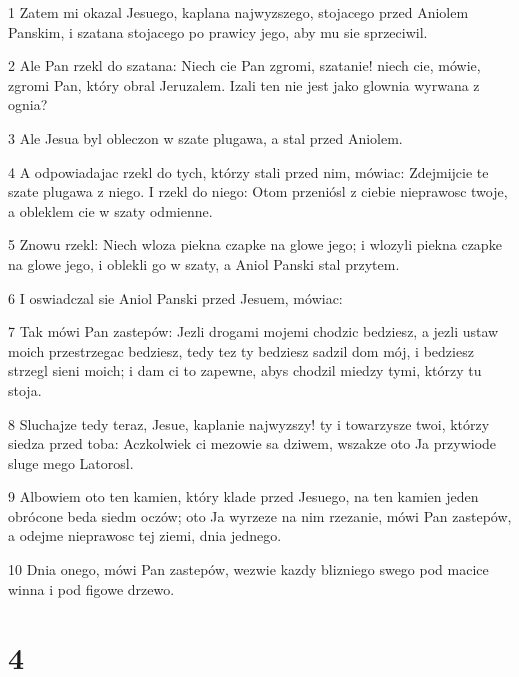 \par 1 Zatem mi okazal Jesuego, kaplana najwyzszego, stojacego przed Aniolem Panskim, i szatana stojacego po prawicy jego, aby mu sie sprzeciwil.
\par 2 Ale Pan rzekl do szatana: Niech cie Pan zgromi, szatanie! niech cie, mówie, zgromi Pan, który obral Jeruzalem. Izali ten nie jest jako glownia wyrwana z ognia?
\par 3 Ale Jesua byl obleczon w szate plugawa, a stal przed Aniolem.
\par 4 A odpowiadajac rzekl do tych, którzy stali przed nim, mówiac: Zdejmijcie te szate plugawa z niego. I rzekl do niego: Otom przeniósl z ciebie nieprawosc twoje, a obleklem cie w szaty odmienne.
\par 5 Znowu rzekl: Niech wloza piekna czapke na glowe jego; i wlozyli piekna czapke na glowe jego, i oblekli go w szaty, a Aniol Panski stal przytem.
\par 6 I oswiadczal sie Aniol Panski przed Jesuem, mówiac:
\par 7 Tak mówi Pan zastepów: Jezli drogami mojemi chodzic bedziesz, a jezli ustaw moich przestrzegac bedziesz, tedy tez ty bedziesz sadzil dom mój, i bedziesz strzegl sieni moich; i dam ci to zapewne, abys chodzil miedzy tymi, którzy tu stoja.
\par 8 Sluchajze tedy teraz, Jesue, kaplanie najwyzszy! ty i towarzysze twoi, którzy siedza przed toba: Aczkolwiek ci mezowie sa dziwem, wszakze oto Ja przywiode sluge mego Latorosl.
\par 9 Albowiem oto ten kamien, który klade przed Jesuego, na ten kamien jeden obrócone beda siedm oczów; oto Ja wyrzeze na nim rzezanie, mówi Pan zastepów, a odejme nieprawosc tej ziemi, dnia jednego.
\par 10 Dnia onego, mówi Pan zastepów, wezwie kazdy blizniego swego pod macice winna i pod figowe drzewo.

\chapter{4}

